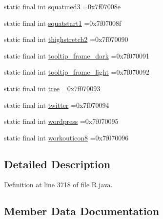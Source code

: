 \begin{DoxyCompactItemize}
\item 
static final int \mbox{\hyperlink{classcom_1_1example_1_1trainawearapplication_1_1_r_1_1drawable_a1280ced02c44fbf5514341693d8fd46d}{squatmed3}} =0x7f07008e
\item 
static final int \mbox{\hyperlink{classcom_1_1example_1_1trainawearapplication_1_1_r_1_1drawable_a0f56f97e089e6af2191cdc487b190ef3}{squatstart1}} =0x7f07008f
\item 
static final int \mbox{\hyperlink{classcom_1_1example_1_1trainawearapplication_1_1_r_1_1drawable_a723a3b1a096eb6df3bc09202912bc93e}{thighstretch2}} =0x7f070090
\item 
static final int \mbox{\hyperlink{classcom_1_1example_1_1trainawearapplication_1_1_r_1_1drawable_ac6219fedaf985c66f1a299eb32d06895}{tooltip\+\_\+frame\+\_\+dark}} =0x7f070091
\item 
static final int \mbox{\hyperlink{classcom_1_1example_1_1trainawearapplication_1_1_r_1_1drawable_a5fcc60dbb7d735ec51fc9bb9d39beefd}{tooltip\+\_\+frame\+\_\+light}} =0x7f070092
\item 
static final int \mbox{\hyperlink{classcom_1_1example_1_1trainawearapplication_1_1_r_1_1drawable_afdf7969b578835611a1be4280657ac3e}{tree}} =0x7f070093
\item 
static final int \mbox{\hyperlink{classcom_1_1example_1_1trainawearapplication_1_1_r_1_1drawable_aac627ec4c4ea186d1b3a96de70677e59}{twitter}} =0x7f070094
\item 
static final int \mbox{\hyperlink{classcom_1_1example_1_1trainawearapplication_1_1_r_1_1drawable_afb375044680afda4aaac07bcd37d2ec6}{wordpress}} =0x7f070095
\item 
static final int \mbox{\hyperlink{classcom_1_1example_1_1trainawearapplication_1_1_r_1_1drawable_af5392e26a2460e42f5b2b8bf22cba82d}{workouticon8}} =0x7f070096
\end{DoxyCompactItemize}


\subsection{Detailed Description}


Definition at line 3718 of file R.\+java.



\subsection{Member Data Documentation}
\mbox{\label{classcom_1_1example_1_1trainawearapplication_1_1_r_1_1drawable_ae9c5343499cb9eb7128155ca14ae7495}} 
